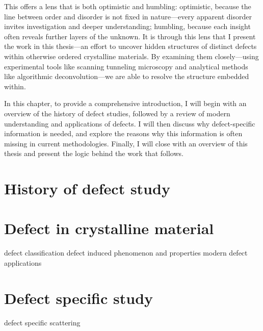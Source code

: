 This offers a lens that is both optimistic and humbling: optimistic, because the line between order and disorder is not fixed in nature—every apparent disorder invites investigation and deeper understanding; humbling, because each insight often reveals further layers of the unknown. It is through this lens that I present the work in this thesis—an effort to uncover hidden structures of distinct defects within otherwise ordered crystalline materials. By examining them closely—using experimental tools like scanning tunneling microscopy and analytical methods like algorithmic deconvolution—we are able to resolve the structure embedded within.

In this chapter, to provide a comprehensive introduction, I will begin with an overview of the history of defect studies, followed by a review of modern understanding and applications of defects. I will then discuss why defect-specific information is needed, and explore the reasons why this information is often missing in current methodologies. Finally, I will close with an overview of this thesis and present the logic behind the work that follows.

\section{History of defect study}

\section{Defect in crystalline material}
defect classification
defect induced phenomenon and properties
modern defect applications
\section{Defect specific study}
defect specific scattering 
